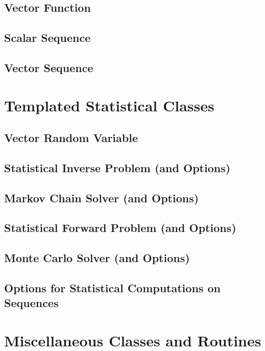 \subsection{Vector Function}

\subsection{Scalar Sequence}

\subsection{Vector Sequence}

\section{Templated Statistical Classes}

\subsection{Vector Random Variable}

\subsection{Statistical Inverse Problem (and Options)}

\subsection{Markov Chain Solver (and Options)}

\subsection{Statistical Forward Problem (and Options)}

\subsection{Monte Carlo Solver (and Options)}

\subsection{Options for Statistical Computations on Sequences}

\section{Miscellaneous Classes and Routines}


